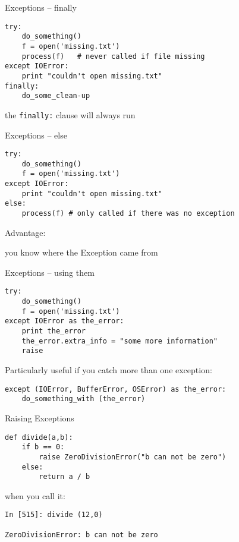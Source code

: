 \documentclass{beamer}
\begin{document}
\begin{frame}[fragile]{Exceptions -- finally }

\vfill
\begin{verbatim}
try:
    do_something()
    f = open('missing.txt')
    process(f)   # never called if file missing
except IOError:
    print "couldn't open missing.txt"
finally:
    do_some_clean-up
\end{verbatim}
\vfill
{\Large the \verb|finally:| clause will always run}
\end{frame}

\begin{frame}[fragile]{Exceptions -- else }

\vfill
\begin{verbatim}
try:
    do_something()
    f = open('missing.txt')
except IOError:
    print "couldn't open missing.txt"
else:
    process(f) # only called if there was no exception
\end{verbatim}
\vfill
{\Large Advantage:

you know where the Exception came from}
\end{frame}

\begin{frame}[fragile]{Exceptions -- using them }

\vfill
\begin{verbatim}
try:
    do_something()
    f = open('missing.txt')
except IOError as the_error:
    print the_error
    the_error.extra_info = "some more information"
    raise
\end{verbatim}

{\Large Particularly useful if you catch more than one exception:}

\begin{verbatim}
except (IOError, BufferError, OSError) as the_error:
    do_something_with (the_error)
\end{verbatim}

\end{frame}


\begin{frame}[fragile]{Raising Exceptions }

\begin{verbatim}
def divide(a,b):
    if b == 0:
        raise ZeroDivisionError("b can not be zero")
    else:
        return a / b
\end{verbatim}
\vfill
{\Large when you call it: }
\vfill
\begin{verbatim}
In [515]: divide (12,0)

ZeroDivisionError: b can not be zero
\end{verbatim}

\end{frame}
\end{document}
